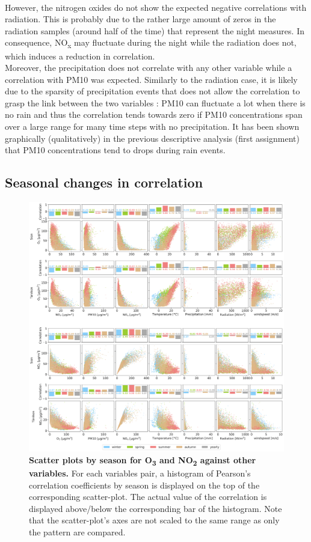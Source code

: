 \documentclass[a4paper, 12pt]{article}
\begin{document}
        \\
        However, the nitrogen oxides do not show the expected negative correlations with radiation. This is probably due to the rather large amount of zeros in the radiation samples (around half of the time) that represent the night measures. In consequence, NO\textsubscript{x} may fluctuate during the night while the radiation does not, which induces a reduction in correlation. 
        \\
        Moreover, the precipitation does not correlate with any other variable while a correlation with PM10 was expected. Similarly to the radiation case, it is likely due to the sparsity of precipitation events that does not allow the correlation to grasp the link between the two variables : PM10 can fluctuate a lot when there is no rain and thus the correlation tends towards zero if PM10 concentrations span over a large range for many time steps with no precipitation. It has been shown graphically (qualitatively) in the previous descriptive analysis (first assignment) that PM10 concentrations tend to drops during rain events. 
    
    \subsection{Seasonal changes in correlation} 
        \begin{figure}[t!]
            \centering
            \includegraphics[width = 1 \textwidth]{Figures/scatter_hist_O3_NO2.png}
            \caption{\textbf{Scatter plots by season for O\textsubscript{3} and NO\textsubscript{2} against other variables.} For each variables pair, a histogram of Pearson's correlation coefficients by season is displayed on the top of the corresponding scatter-plot. The actual value of the correlation is displayed above/below the corresponding bar of the histogram. Note that the scatter-plot's axes are not scaled to the same range as only the pattern are compared.}
            \label{fig:scatter_hist}
        \end{figure}
        
\end{document}
